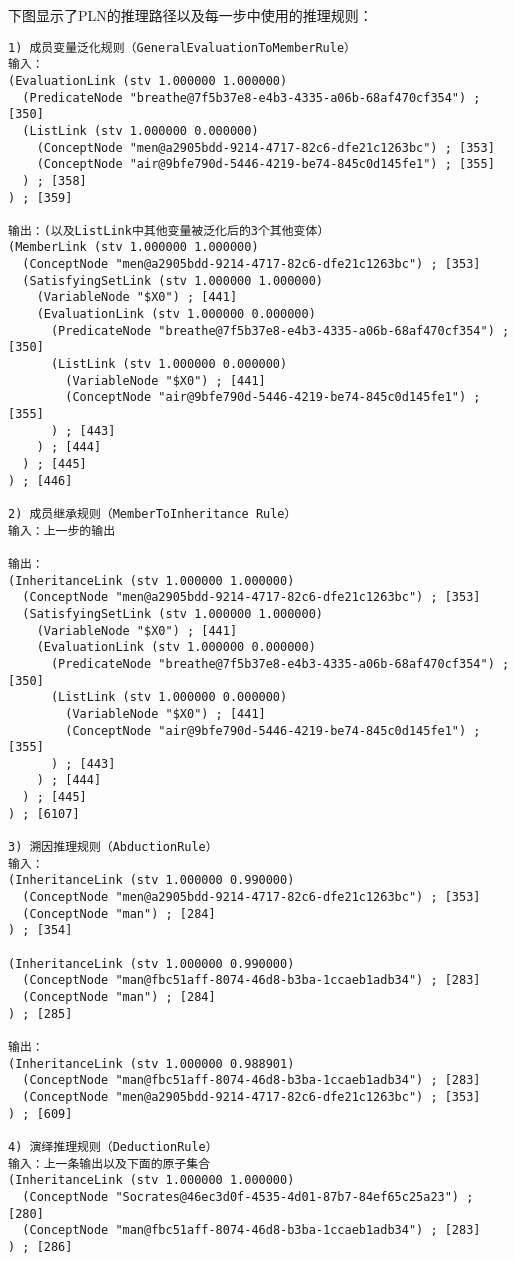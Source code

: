 下图显示了PLN的推理路径以及每一步中使用的推理规则：

{\tt\begin{small}\begin{lstlisting}
1) 成员变量泛化规则（GeneralEvaluationToMemberRule）
输入：
(EvaluationLink (stv 1.000000 1.000000)
  (PredicateNode "breathe@7f5b37e8-e4b3-4335-a06b-68af470cf354") ; [350]
  (ListLink (stv 1.000000 0.000000)
    (ConceptNode "men@a2905bdd-9214-4717-82c6-dfe21c1263bc") ; [353]
    (ConceptNode "air@9bfe790d-5446-4219-be74-845c0d145fe1") ; [355]
  ) ; [358]
) ; [359]

输出：(以及ListLink中其他变量被泛化后的3个其他变体）
(MemberLink (stv 1.000000 1.000000)
  (ConceptNode "men@a2905bdd-9214-4717-82c6-dfe21c1263bc") ; [353]
  (SatisfyingSetLink (stv 1.000000 1.000000)
    (VariableNode "$X0") ; [441]
    (EvaluationLink (stv 1.000000 0.000000)
      (PredicateNode "breathe@7f5b37e8-e4b3-4335-a06b-68af470cf354") ; [350]
      (ListLink (stv 1.000000 0.000000)
        (VariableNode "$X0") ; [441]
        (ConceptNode "air@9bfe790d-5446-4219-be74-845c0d145fe1") ; [355]
      ) ; [443]
    ) ; [444]
  ) ; [445]
) ; [446]

2) 成员继承规则（MemberToInheritance Rule）
输入：上一步的输出

输出：
(InheritanceLink (stv 1.000000 1.000000)
  (ConceptNode "men@a2905bdd-9214-4717-82c6-dfe21c1263bc") ; [353]
  (SatisfyingSetLink (stv 1.000000 1.000000)
    (VariableNode "$X0") ; [441]
    (EvaluationLink (stv 1.000000 0.000000)
      (PredicateNode "breathe@7f5b37e8-e4b3-4335-a06b-68af470cf354") ; [350]
      (ListLink (stv 1.000000 0.000000)
        (VariableNode "$X0") ; [441]
        (ConceptNode "air@9bfe790d-5446-4219-be74-845c0d145fe1") ; [355]
      ) ; [443]
    ) ; [444]
  ) ; [445]
) ; [6107]

3) 溯因推理规则（AbductionRule）
输入：
(InheritanceLink (stv 1.000000 0.990000)
  (ConceptNode "men@a2905bdd-9214-4717-82c6-dfe21c1263bc") ; [353]
  (ConceptNode "man") ; [284]
) ; [354]

(InheritanceLink (stv 1.000000 0.990000)
  (ConceptNode "man@fbc51aff-8074-46d8-b3ba-1ccaeb1adb34") ; [283]
  (ConceptNode "man") ; [284]
) ; [285]

输出：
(InheritanceLink (stv 1.000000 0.988901)
  (ConceptNode "man@fbc51aff-8074-46d8-b3ba-1ccaeb1adb34") ; [283]
  (ConceptNode "men@a2905bdd-9214-4717-82c6-dfe21c1263bc") ; [353]
) ; [609]

4) 演绎推理规则（DeductionRule）
输入：上一条输出以及下面的原子集合
(InheritanceLink (stv 1.000000 1.000000)
  (ConceptNode "Socrates@46ec3d0f-4535-4d01-87b7-84ef65c25a23") ; [280]
  (ConceptNode "man@fbc51aff-8074-46d8-b3ba-1ccaeb1adb34") ; [283]
) ; [286]


\end{lstlisting}
\end{small}}
